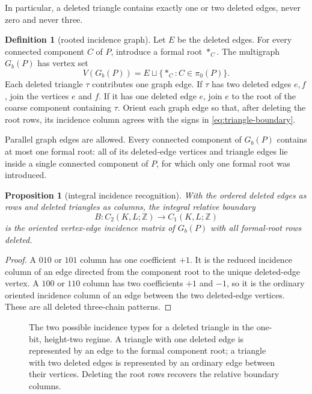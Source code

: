 \documentclass[11pt]{article}
\newtheorem{proposition}[theorem]{Proposition}
\theoremstyle{definition}
\newtheorem{definition}[theorem]{Definition}
\theoremstyle{remark}
\newcommand{\Z}{\mathbb Z}
\begin{document}
In particular, a deleted triangle contains exactly one or two deleted edges, never
zero and never three.

\begin{definition}[rooted incidence graph]\label{def:rootedgraph}
Let $E$ be the deleted edges.  For every connected component $C$ of $P$, introduce a
formal root $*_C$.  The multigraph $G_b(P)$ has vertex set
\[
  V(G_b(P))=E\sqcup\{*_C:C\in\pi_0(P)\}.
\]
Each deleted triangle $\tau$ contributes one graph edge.  If $\tau$ has two deleted
edges $e,f$, join the vertices $e$ and $f$.  If it has one deleted edge $e$, join $e$
to the root of the coarse component containing $\tau$.  Orient each graph edge so that,
after deleting the root rows, its incidence column agrees with the signs in
\eqref{eq:triangle-boundary}.
\end{definition}

Parallel graph edges are allowed.  Every connected component of $G_b(P)$ contains at
most one formal root: all of its deleted-edge vertices and triangle edges lie inside a
single connected component of $P$, for which only one formal root was introduced.

\begin{proposition}[integral incidence recognition]\label{prop:integral-incidence}
With the ordered deleted edges as rows and deleted triangles as columns, the integral
relative boundary
\[
  B:C_2(K,L;\Z)\longrightarrow C_1(K,L;\Z)
\]
is the oriented vertex-edge incidence matrix of $G_b(P)$ with all formal-root rows
deleted.
\end{proposition}

\begin{proof}
A $010$ or $101$ column has one coefficient $+1$.  It is the reduced incidence column
of an edge directed from the component root to the unique deleted-edge vertex.  A
$100$ or $110$ column has two coefficients $+1$ and $-1$, so it is the ordinary
oriented incidence column of an edge between the two deleted-edge vertices.  These
are all deleted three-chain patterns.
\end{proof}

\begin{figure}[t]
\centering
{}
\caption{The two possible incidence types for a deleted triangle in the one-bit,
height-two regime.  A triangle with one deleted edge is represented by an edge to the
formal component root; a triangle with two deleted edges is represented by an ordinary
edge between their vertices.  Deleting the root rows recovers the relative boundary
columns.}
\label{fig:incidence-types}
\end{figure}
\end{document}
